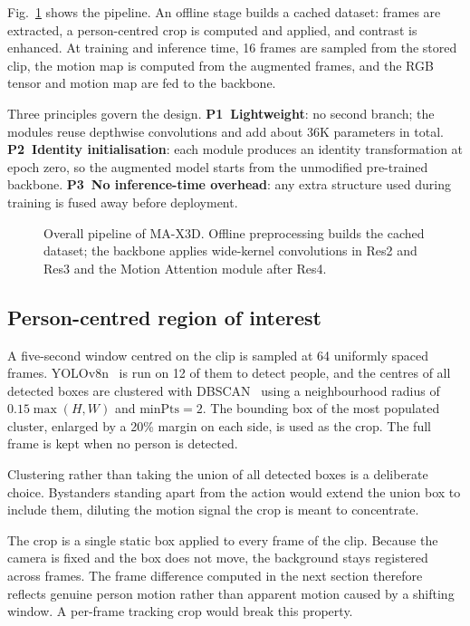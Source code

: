 \documentclass[conference]{IEEEtran}
\begin{document}
Fig.~\ref{fig:pipeline} shows the pipeline. An offline stage builds
a cached dataset: frames are extracted, a person-centred crop is
computed and applied, and contrast is enhanced. At training and
inference time, 16 frames are sampled from the stored clip, the motion
map is computed from the augmented frames, and the RGB tensor and
motion map are fed to the backbone.

Three principles govern the design. \textbf{P1~Lightweight}: no second
branch; the modules reuse depthwise convolutions and add about 36K
parameters in total. \textbf{P2~Identity initialisation}: each module
produces an identity transformation at epoch zero, so the augmented
model starts from the unmodified pre-trained backbone.
\textbf{P3~No inference-time overhead}: any extra structure used during
training is fused away before deployment.

\begin{figure}[t]
  \centering
  \caption{Overall pipeline of MA-X3D. Offline preprocessing builds the
  cached dataset; the backbone applies wide-kernel convolutions in Res2
  and Res3 and the Motion Attention module after Res4.}
  \label{fig:pipeline}
\end{figure}

\subsection{Person-centred region of interest}

A five-second window centred on the clip is sampled at 64 uniformly
spaced frames. YOLOv8n~\cite{yolov8} is run on 12 of them to detect
people, and the centres of all detected boxes are clustered with
DBSCAN~\cite{dbscan} using a neighbourhood radius of
$0.15 \max(H, W)$ and $\mathrm{minPts}=2$. The bounding box of the
most populated cluster, enlarged by a 20\% margin on each side, is
used as the crop. The full frame is kept when no person is detected.

Clustering rather than taking the union of all detected boxes is a
deliberate choice. Bystanders standing apart from the action would
extend the union box to include them, diluting the motion signal the
crop is meant to concentrate.

The crop is a single static box applied to every frame of the clip.
Because the camera is fixed and the box does not move, the background
stays registered across frames. The frame difference computed in the
next section therefore reflects genuine person motion rather than
apparent motion caused by a shifting window. A per-frame tracking crop
would break this property.
\end{document}
